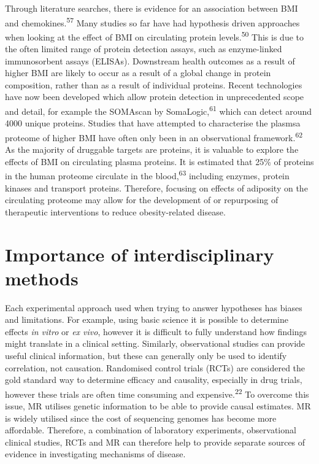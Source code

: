 \documentclass[11pt,twoside]{bristolthesis}
\begin{document}
Through literature searches, there is evidence for an association between BMI and chemokines.\textsuperscript{57} Many studies so far have had hypothesis driven approaches when looking at the effect of BMI on circulating protein levels.\textsuperscript{50} This is due to the often limited range of protein detection assays, such as enzyme-linked immunosorbent assays (ELISAs). Downstream health outcomes as a result of higher BMI are likely to occur as a result of a global change in protein composition, rather than as a result of individual proteins. Recent technologies have now been developed which allow protein detection in unprecedented scope and detail, for example the SOMAscan by SomaLogic,\textsuperscript{61} which can detect around 4000 unique proteins. Studies that have attempted to characterise the plasmsa proteome of higher BMI have often only been in an observational framework.\textsuperscript{62} As the majority of druggable targets are proteins, it is valuable to explore the effects of BMI on circulating plasma proteins. It is estimated that 25\% of proteins in the human proteome circulate in the blood,\textsuperscript{63} including enzymes, protein kinases and transport proteins. Therefore, focusing on effects of adiposity on the circulating proteome may allow for the development of or repurposing of therapeutic interventions to reduce obesity-related disease.

\hypertarget{importance-of-interdisciplinary-methods}{%
\section{Importance of interdisciplinary methods}\label{importance-of-interdisciplinary-methods}}

Each experimental approach used when trying to answer hypotheses has biases and limitations. For example, using basic science it is possible to determine effects \emph{in vitro} or \emph{ex vivo}, however it is difficult to fully understand how findings might translate in a clinical setting. Similarly, observational studies can provide useful clinical information, but these can generally only be used to identify correlation, not causation. Randomised control trials (RCTs) are considered the gold standard way to determine efficacy and causality, especially in drug trials, however these trials are often time consuming and expensive.\textsuperscript{22} To overcome this issue, MR utilises genetic information to be able to provide causal estimates. MR is widely utilised since the cost of sequencing genomes has become more affordable. Therefore, a combination of laboratory experiments, observational clinical studies, RCTs and MR can therefore help to provide separate sources of evidence in investigating mechanisms of disease.
\end{document}
